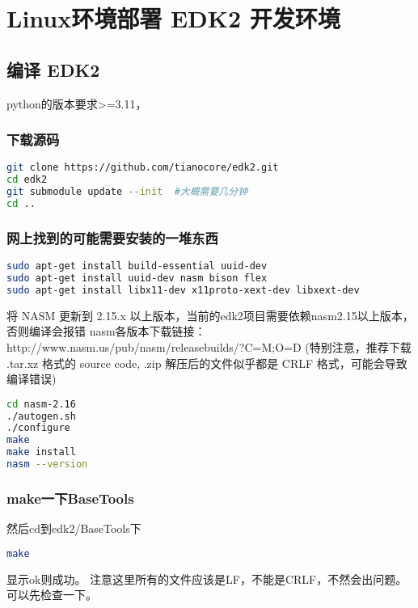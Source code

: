 \section{Linux环境部署 EDK2 开发环境}

\subsection{编译 EDK2}

python的版本要求>=3.11，

\subsubsection{下载源码}
\begin{lstlisting}[language=bash]
git clone https://github.com/tianocore/edk2.git
cd edk2
git submodule update --init  #大概需要几分钟
cd ..
\end{lstlisting}

\subsubsection{网上找到的可能需要安装的一堆东西} \label{compile-edk2}

\begin{lstlisting}[language=bash]
sudo apt-get install build-essential uuid-dev
sudo apt-get install uuid-dev nasm bison flex
sudo apt-get install libx11-dev x11proto-xext-dev libxext-dev
\end{lstlisting}

将 NASM 更新到 2.15.x 以上版本，当前的edk2项目需要依赖nasm2.15以上版本，否则编译会报错
nasm各版本下载链接：http://www.nasm.us/pub/nasm/releasebuilds/?C=M;O=D
(特别注意，推荐下载 .tar.xz 格式的 source code, .zip 解压后的文件似乎都是 CRLF 格式，可能会导致编译错误)

\begin{lstlisting}[language=bash]
cd nasm-2.16
./autogen.sh
./configure
make
make install
nasm --version
\end{lstlisting}

\subsubsection{make一下BaseTools}

然后cd到edk2/BaseTools下
\begin{lstlisting}[language=bash]
make
\end{lstlisting}

显示ok则成功。
注意这里所有的文件应该是LF，不能是CRLF，不然会出问题。可以先检查一下。

